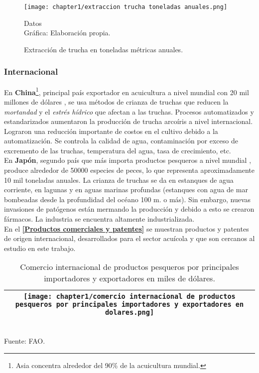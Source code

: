 \begin{figure}[H]
	\centering
	\texttt{[image: chapter1/extraccion trucha toneladas anuales.png]}
	\caption{Extracción de trucha en toneladas métricas anuales.}
	 Datos \cite{MinisteriodelaProducciondelPeru2018}\\
	  Gráfica: Elaboración propia.
	\label{fig:Extracción de trucha en toneladas métricas anuales}
\end{figure}

\subsubsection{Internacional}

En \textbf{China}\footnote{Asia concentra alrededor del 90\% de la acuicultura mundial.\cite{Powell2003}}, principal país exportador en acuicultura a nivel mundial con 20 mil millones de dólares \cite[p.~44]{FAO2017}, se usa métodos de crianza de truchas que reducen la \textit{mortandad} y el \textit{estrés hídrico} que afectan a las truchas. Procesos automatizados y estandarizados aumentaron la producción de trucha arcoíris a nivel internacional. Lograron una reducción importante de costos en el cultivo debido a la automatización. Se controla la calidad de agua, contaminación por exceso de excremento de las truchas, temperatura del agua, tasa de crecimiento, etc. \cite[p.~1-6]{2017} \\

En \textbf{Japón}, segundo país que más importa productos pesqueros a nivel mundial \cite[p.~44]{FAO2017}, produce alrededor de 50000 especies de peces, lo que representa aproximadamente 10 mil toneladas anuales. La crianza de truchas se da en estanques de agua corriente, en lagunas y en aguas marinas profundas (estanques con agua de mar bombeadas desde la profundidad del océano 100 m. o más). Sin embargo, nuevas invasiones de patógenos están mermando la producción y debido a esto se crearon fármacos. La industria se encuentra altamente industrializada. \cite[p.~1-5]{2005} \\

En el \textbf{\ref{Productos comerciales y patentes}} se muestran productos y patentes de origen internacional, desarrollados para el sector acuícola y que son cercanos al estudio en este trabajo.

\begin{table}[H]
	\centering	
	\caption{Comercio internacional de productos pesqueros por principales importadores y exportadores en miles de dólares.}
	\label{tbl:comercio internacional de productos pesqueros por principales importadores y exportadores en dolares}
	\begin{tabular}{ | c | }
		\hline
		\begin{minipage}{1\textwidth}
			\texttt{[image: chapter1/comercio internacional de productos pesqueros por principales importadores y exportadores en dolares.png]}
		\end{minipage}		
		\\ \hline
	\end{tabular}
	\\	Fuente: FAO.
\end{table}

